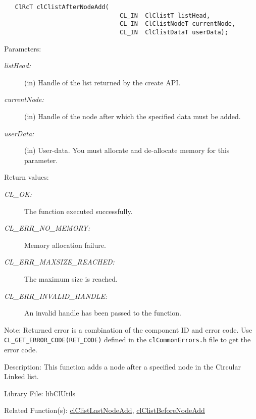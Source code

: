 \begin{flushleft}
\begin{Desc}
\footnotesize\begin{verbatim}   ClRcT clClistAfterNodeAdd(
                         		CL_IN  ClClistT listHead,
                         		CL_IN  ClClistNodeT currentNode,
                         		CL_IN  ClClistDataT userData);
\end{verbatim}
\normalsize
\end{Desc}
\begin{Desc}
\item[Parameters:]
\begin{description}
\item[{\em list\-Head:}](in) Handle of the list returned by the create API. \item[{\em current\-Node:}](in) Handle of the node after which the specified 
data must be added. \item[{\em user\-Data:}](in) User-data. You must allocate and de-allocate memory for this parameter.\end{description}
\end{Desc}
\begin{Desc}
\item[Return values:]
\begin{description}
\item[{\em CL\_\-OK:}]The function executed successfully. \item[{\em CL\_\-ERR\_\-NO\_\-MEMORY:}]Memory allocation failure. 
\item[{\em CL\_\-ERR\_\-MAXSIZE\_\-REACHED:}]The maximum size is reached. 
\item[{\em CL\_\-ERR\_\-INVALID\_\-HANDLE:}]An invalid handle has been passed to the function.\end{description}
\end{Desc}
\begin{Desc}
\item[Note:]Returned error is a combination of the component ID and error code. Use {\tt{CL\_\-GET\_\-ERROR\_\-CODE(RET\_\-CODE)}} defined in
the {\tt{clCommonErrors.h}} file to get the error code.\end{Desc}
\begin{Desc}
\item[Description:]This function adds a node after a specified node in the Circular Linked list.\end{Desc}
\begin{Desc}
\item[Library File:]lib\-Cl\-Utils\end{Desc}
\begin{Desc}
\item[Related Function(s):]\hyperlink{pagecl103}{cl\-Clist\-Last\-Node\-Add}, \hyperlink{pagecl105}{cl\-Clist\-Before\-Node\-Add} \end{Desc}
\newpage


\end{flushleft}
